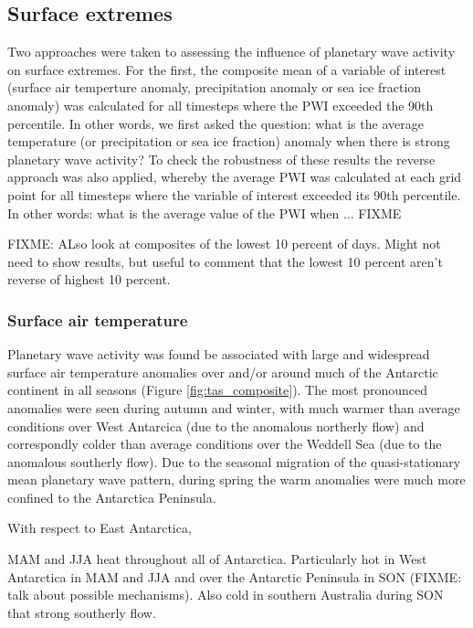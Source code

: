 \subsection{Surface extremes}

Two approaches were taken to assessing the influence of planetary wave activity on surface extremes. For the first, the composite mean of a variable of interest (surface air temperture anomaly, precipitation anomaly or sea ice fraction anomaly) was calculated for all timesteps where the PWI exceeded the 90th percentile. In other words, we first asked the question: what is the average temperature (or precipitation or sea ice fraction) anomaly when there is strong planetary wave activity? To check the robustness of these results the reverse approach was also applied, whereby the average PWI was calculated at each grid point for all timesteps where the variable of interest exceeded its 90th percentile. In other words: what is the average value of the PWI when ... FIXME

FIXME: ALso look at composites of the lowest 10 percent of days. Might not need to show results, but useful to comment that the lowest 10 percent aren't reverse of highest 10 percent.

\subsubsection{Surface air temperature}

Planetary wave activity was found be associated with large and widespread surface air temperature anomalies over and/or around much of the Antarctic continent in all seasons (Figure \ref{fig:tas_composite}). The most pronounced anomalies were seen during autumn and winter, with much warmer than average conditions over West Antarcica (due to the anomalous northerly flow) and correspondly colder than average conditions over the Weddell Sea (due to the anomalous southerly flow). Due to the seasonal migration of the quasi-stationary mean planetary wave pattern, during spring the warm anomalies were much more confined to the Antarctica Peninsula.  

With respect to East Antarctica, 

MAM and JJA heat throughout all of Antarctica. Particularly hot in West Antarctica in MAM and JJA and over the Antarctic Peninsula in SON (FIXME: talk about possible mechanisms). Also cold in southern Australia during SON that strong southerly flow.


